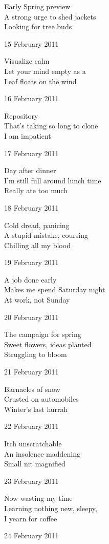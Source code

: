 \documentclass[12pt]{article}
\begin{document}
Early Spring preview \\
A strong urge to shed jackets \\
Looking for tree buds


\newpage


15 February 2011

Visualize calm \\
Let your mind empty as a \\
Leaf floats on the wind

16 February 2011

Repository \\
That's taking so long to clone \\
I am impatient

17 February 2011

Day after dinner \\
I'm still full around lunch time \\
Really ate too much

18 February 2011

Cold dread, panicing \\
A stupid mistake, coursing \\
Chilling all my blood

19 February 2011

A job done early \\
Makes me spend Saturday night \\
At work, not Sunday

20 February 2011

The campaign for spring \\
Sweet flowers, ideas planted \\
Struggling to bloom

21 February 2011

Barnacles of snow \\
Crusted on automobiles \\
Winter's last hurrah


\newpage

22 February 2011

Itch unscratchable \\
An insolence maddening \\
Small nit magnified

23 February 2011

Now wasting my time \\
Learning nothing new, sleepy, \\
I yearn for coffee

24 February 2011
\end{document}
